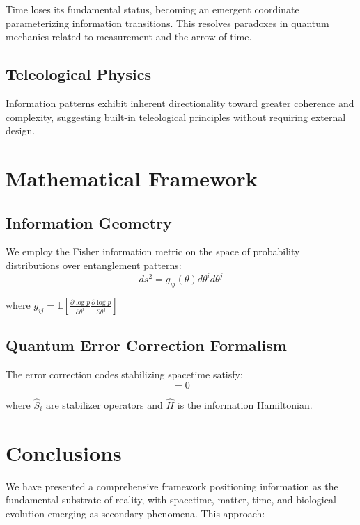 \documentclass[12pt]{article}
\begin{document}
Time loses its fundamental status, becoming an emergent coordinate parameterizing information transitions. This resolves paradoxes in quantum mechanics related to measurement and the arrow of time.

\subsection{Teleological Physics}

Information patterns exhibit inherent directionality toward greater coherence and complexity, suggesting built-in teleological principles without requiring external design.

\section{Mathematical Framework}

\subsection{Information Geometry}

We employ the Fisher information metric on the space of probability distributions over entanglement patterns:
\begin{equation}
ds^2 = g_{ij}(\theta) d\theta^i d\theta^j
\end{equation}

where $g_{ij} = \mathbb{E}\left[\frac{\partial \log p}{\partial \theta^i}\frac{\partial \log p}{\partial \theta^j}\right]$

\subsection{Quantum Error Correction Formalism}

The error correction codes stabilizing spacetime satisfy:
\begin{equation}
[\hat{S}_i, \hat{H}] = 0
\end{equation}

where $\hat{S}_i$ are stabilizer operators and $\hat{H}$ is the information Hamiltonian.

\section{Conclusions}

We have presented a comprehensive framework positioning information as the fundamental substrate of reality, with spacetime, matter, time, and biological evolution emerging as secondary phenomena. This approach:
\end{document}
